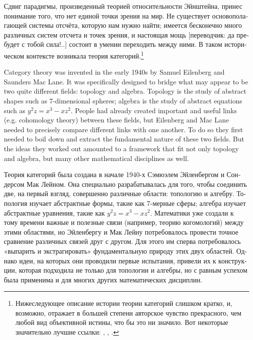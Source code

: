 \documentclass[a4paper]{book}
\theoremstyle{myth}
\begin{document}
\begin{russian}
Сдвиг парадигмы, произведенный теорией относительности Эйнштейна, принес понимание того, что нет единой точки зрения на мир. Не существует основополагающей системы отсчёта, которую нам нужно найти; имеется бесконечно много различных систем отсчета и точек зрения, и настоящая мощь [переводчик: да пребудет с тобой сила!..] состоит в умении переходить между ними. В таком историческом контексте возникала теория категорий.\footnote{Нижеследующее описание истории теории категорий слишком кратко, и, возможно, отражает в большей степени авторское чувство прекрасного, чем любой вид объективной истины, что бы это ни значило. Вот некоторые значительно лучшие ссылки: \cite{Kro}, \cite{Mar1}, \cite{LM}.}

Category theory was invented in the early 1940s by Samuel Eilenberg and Saunders Mac Lane. It was specifically designed to bridge what may appear to be two quite different fields: topology and algebra. Topology is the study of abstract shapes such as 7-dimensional spheres; algebra is the study of abstract equations such as $y^2z=x^3-xz^2$. People had already created important and useful links (e.g. cohomology theory) between these fields, but Eilenberg and Mac Lane needed to precisely compare different links with one another. To do so they first needed to boil down and extract the fundamental nature of these two fields. But the ideas they worked out amounted to a framework that fit not only topology and algebra, but many other mathematical disciplines as well.

Теория категорий была создана в начале 1940-х Сэмюэлем Эйленбергом и Сондерсом Мак Лейном. Она специально разрабатывалась для того, чтобы соединить две, на первый взгляд, совершенно различные области: топологию и алгебру. Топология изучает абстрактные формы, такие как 7-мерные сферы; алгебра изучает абстрактные уравнения, такие как $y^2z=x^3-xz^2$. Математики уже создали к тому времени важные и полезные связи (например, теорию когомологий) между этими областями, но Эйленбергу и Мак Лейну потребовалось провести точное сравнение различных связей друг с другом. Для этого им сперва потребовалось «выпарить и экстрагировать» фундаментальную природу этих двух областей. Однако идеи, на которых они проводили первые испытания, привели их к конструкции, которая подходила не только для топологии и алгебры, но с равным успехом была применима и для многих других математических дисциплин. 


\end{russian}
\end{document}
